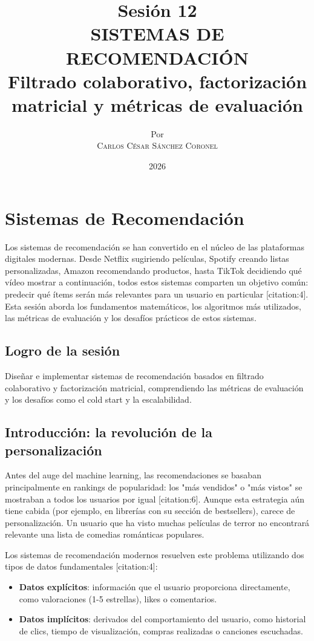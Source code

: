 \documentclass[12pt,a4paper,openany,oneside]{book}
\title{
    \textbf{Sesión 12} \\ 
    \Huge \textbf{SISTEMAS DE RECOMENDACIÓN} \\
    \Large Filtrado colaborativo, factorización matricial y métricas de evaluación
}
\author{
    \small Por \\ \vspace{0.2cm}
    \Large \textsc{Carlos César Sánchez Coronel}
}
\date{2026}
\begin{document}
\maketitle
\tableofcontents
{}

\chapter{Sistemas de Recomendación}

Los sistemas de recomendación se han convertido en el núcleo de las plataformas digitales modernas. Desde Netflix sugiriendo películas, Spotify creando listas personalizadas, Amazon recomendando productos, hasta TikTok decidiendo qué vídeo mostrar a continuación, todos estos sistemas comparten un objetivo común: predecir qué ítems serán más relevantes para un usuario en particular [citation:4]. Esta sesión aborda los fundamentos matemáticos, los algoritmos más utilizados, las métricas de evaluación y los desafíos prácticos de estos sistemas.

\section{Logro de la sesión}
Diseñar e implementar sistemas de recomendación basados en filtrado colaborativo y factorización matricial, comprendiendo las métricas de evaluación y los desafíos como el cold start y la escalabilidad.

\section{Introducción: la revolución de la personalización}

Antes del auge del machine learning, las recomendaciones se basaban principalmente en rankings de popularidad: los "más vendidos" o "más vistos" se mostraban a todos los usuarios por igual [citation:6]. Aunque esta estrategia aún tiene cabida (por ejemplo, en librerías con su sección de bestsellers), carece de personalización. Un usuario que ha visto muchas películas de terror no encontrará relevante una lista de comedias románticas populares.

Los sistemas de recomendación modernos resuelven este problema utilizando dos tipos de datos fundamentales [citation:4]:
\begin{itemize}
    \item \textbf{Datos explícitos}: información que el usuario proporciona directamente, como valoraciones (1-5 estrellas), likes o comentarios.
    \item \textbf{Datos implícitos}: derivados del comportamiento del usuario, como historial de clics, tiempo de visualización, compras realizadas o canciones escuchadas.
\end{itemize}
\end{document}
